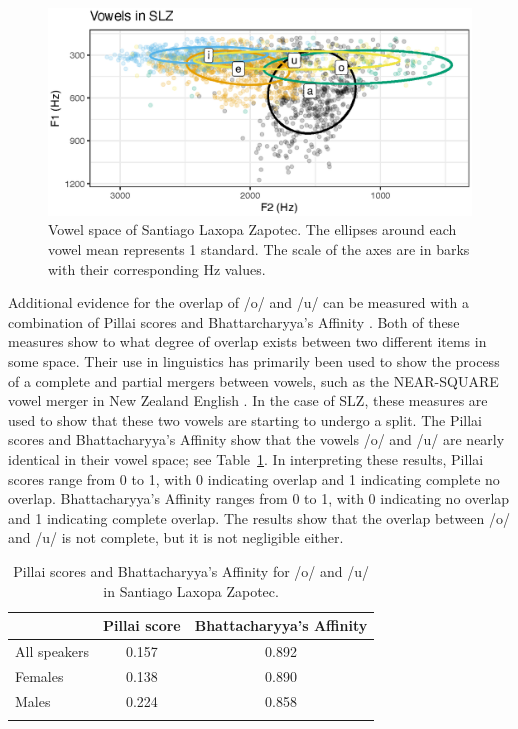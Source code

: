 \begin{figure}[!h]
    \centering
    \includegraphics{images/slz_vowels.eps}
    \caption{Vowel space of Santiago Laxopa Zapotec. The ellipses around each vowel mean represents 1 standard. The scale of the axes are in barks with their corresponding Hz values.}
    \label{fig:SLZvowels}
\end{figure}

Additional evidence for the overlap of /o/ and /u/ can be measured with a combination of Pillai scores \citep{pillaiNewTestCriteria1955,hayFactorsInfluencingSpeech2006,nyczBestPracticesMeasuring2014} and Bhattarcharyya's Affinity \citep{bhattacharyyaMeasureDivergenceTwo1943,johnsonQuantifyingOverlapBhattacharyyas2015,warrenQualityQuantityNew2018,strellufChapter3Low2018}. Both of these measures show to what degree of overlap exists between two different items in some space. Their use in linguistics has primarily been used to show the process of a complete and partial mergers between vowels, such as the NEAR-SQUARE vowel merger in New Zealand English \citep{hayFactorsInfluencingSpeech2006}. In the case of SLZ, these measures are used to show that these two vowels are starting to undergo a split. The Pillai scores and Bhattacharyya's Affinity show that the vowels /o/ and /u/ are nearly identical in their vowel space; see Table~\ref{tab:SLZvowels}. In interpreting these results, Pillai scores range from 0 to 1, with 0 indicating overlap and 1 indicating complete no overlap. Bhattacharyya's Affinity ranges from 0 to 1, with 0 indicating no overlap and 1 indicating complete overlap. The results show that the overlap between /o/ and /u/ is not complete, but it is not negligible either.

\begin{table}[!h]
    \centering
    \caption{Pillai scores and Bhattacharyya's Affinity for /o/ and /u/ in Santiago Laxopa Zapotec.}
    \label{tab:SLZvowels}
    \begin{tabular}{lcc}
        \lsptoprule
        &  Pillai score & Bhattacharyya's Affinity \\
        \midrule
        All speakers & 0.157 & 0.892 \\
        Females & 0.138 & 0.890 \\
        Males   & 0.224 & 0.858 \\
        \lspbottomrule
    \end{tabular}
\end{table}
